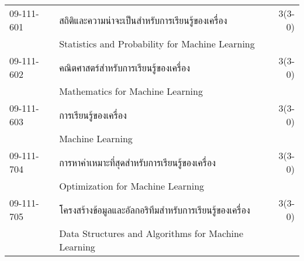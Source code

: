 \begin{longtable}{p{}p{}r{}}
09-111-601 & สถิติและความน่าจะเป็นสำหรับการเรียนรู้ของเครื่อง & 3(3-0)\\
& Statistics and Probability for Machine Learning & \\[3mm]
09-111-602 & คณิตศาสตร์สำหรับการเรียนรู้ของเครื่อง & 3(3-0)\\
& Mathematics for Machine Learning & \\[3mm]
09-111-603 & การเรียนรู้ของเครื่อง & 3(3-0)\\
& Machine Learning & \\[3mm]
09-111-704 & การหาค่าเหมาะที่สุดสำหรับการเรียนรู้ของเครื่อง & 3(3-0)\\
& Optimization for Machine Learning & \\[3mm]
09-111-705 & โครงสร้างข้อมูลและอัลกอริทึมสำหรับการเรียนรู้ของเครื่อง & 3(3-0)\\
& Data Structures and Algorithms for Machine Learning & \\[3mm]
\end{longtable}
